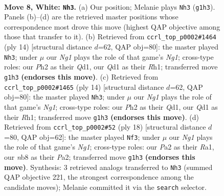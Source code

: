 \documentclass[11pt]{article}
\begin{document}
\begin{figure}[p]\centering
\begin{subfigure}{0.46\textwidth}\centering
\resizebox{\linewidth}{!}{%
\newchessgame
\chessboard[
  setfen={rnb1k2r/pppnqpp1/4p3/3pP2p/3P1P2/2N5/PPP3PP/R2QKBNR w KQkq - 0 8},
  showmover=false,
  pgfstyle=straightmove, color=movearrow, markmove={g1-h3}
]}
\caption{}
\end{subfigure}\hfill
\begin{subfigure}{0.46\textwidth}\centering
\resizebox{\linewidth}{!}{%
\newchessgame
\chessboard[
  setfen={rnb1k2r/pppn1ppp/4p3/3pP1q1/3P4/2N5/PPP2PP1/R2QKBNR w KQkq - 0 8},
  showmover=false,
  pgfstyle=straightmove, color=movearrow, markmove={g1-h3}
]}
\caption{}
\end{subfigure}
\\[4pt]
\begin{subfigure}{0.46\textwidth}\centering
\resizebox{\linewidth}{!}{%
\newchessgame
\chessboard[
  setfen={rnb1k2r/pppn1ppp/4p3/3pP1q1/3P4/2N5/PPP2PP1/R2QKBNR w KQkq - 0 8},
  showmover=false,
  pgfstyle=straightmove, color=movearrow, markmove={g1-h3}
]}
\caption{}
\end{subfigure}\hfill
\begin{subfigure}{0.46\textwidth}\centering
\resizebox{\linewidth}{!}{%
\newchessgame
\chessboard[
  setfen={r1b1k2r/pp1nnppp/2pq4/3p4/3P4/1QNBP3/PP3PPP/R3K1NR w KQkq - 2 10},
  showmover=false,
  pgfstyle=straightmove, color=movearrow, markmove={g1-f3}
]}
\caption{}
\end{subfigure}
\caption{\textbf{Move 8, White: \texttt{Nh3}.} (a) Our position; Melanie plays \texttt{Nh3} (\texttt{g1h3}). Panels (b)--(d) are the retrieved master positions whose correspondence most drove this move (highest QAP objective among those that transfer to it). (b) Retrieved from \texttt{ccrl\_top\_p0002\#1464} (ply 14) [structural distance $d$=62, QAP obj=80]: the master played \texttt{Nh3}; under $\mu$ our \emph{Ng1} plays the role of that game's \emph{Ng1}; cross-type roles: our \emph{P}h2 as their \emph{Q}d1, our \emph{Q}d1 as their \emph{R}h1; transferred move \texttt{g1h3} \textbf{(endorses this move)}. (c) Retrieved from \texttt{ccrl\_top\_p0002\#1465} (ply 14) [structural distance $d$=62, QAP obj=80]: the master played \texttt{Nh3}; under $\mu$ our \emph{Ng1} plays the role of that game's \emph{Ng1}; cross-type roles: our \emph{P}h2 as their \emph{Q}d1, our \emph{Q}d1 as their \emph{R}h1; transferred move \texttt{g1h3} \textbf{(endorses this move)}. (d) Retrieved from \texttt{ccrl\_top\_p0002\#52} (ply 18) [structural distance $d$=80, QAP obj=62]: the master played \texttt{Nf3}; under $\mu$ our \emph{Ng1} plays the role of that game's \emph{Ng1}; cross-type roles: our \emph{P}a2 as their \emph{R}a1, our \emph{n}b8 as their \emph{P}a2; transferred move \texttt{g1h3} \textbf{(endorses this move)}. Synthesis: 3 retrieved analogs transferred to \texttt{Nh3} (summed QAP objective 221, the strongest correspondence among the candidate moves); Melanie committed it via the \texttt{search} selector.}
\label{fig:thought-m14}
\end{figure}
\end{document}
